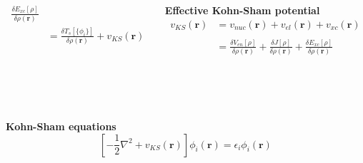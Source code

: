 \documentclass[mathserif, 8pt]{beamer}
\begin{document}
\begin{frame}
\begin{columns}
\begin{column}{.50\textwidth}
\begin{align}
	\frac{\delta E_{xc}[\rho]}{\delta \rho(\boldsymbol{r})}\\
	\nonumber
	&= \frac{\delta T_s[\lbrace\phi_i\rbrace]}{\delta \rho(\boldsymbol{r})} + v_{KS}(\boldsymbol{r})
    \end{align}
    \end{column}
    \begin{column}{.50\textwidth}
    \centering
    \textbf{Effective Kohn-Sham potential}
    \begin{align}
	\nonumber
	v_{KS}(\boldsymbol{r}) &= 
	v_{nuc}(\boldsymbol{r}) + v_{el}(\boldsymbol{r}) + v_{xc}(\boldsymbol{r})\\
	\nonumber
				&\\
	\nonumber
				&=
	\frac{\delta V_{en}[\rho]}{\delta \rho(\boldsymbol{r})} + 
	\frac{\delta J[\rho]}{\delta \rho(\boldsymbol{r})} + 
	\frac{\delta E_{xc}[\rho]}{\delta \rho(\boldsymbol{r})}
    \end{align}
    \end{column}
    \end{columns}
    \ \\
    \ \\
    \ \\
    \centering
    \textbf{Kohn-Sham equations}
    \begin{equation}
	\nonumber
	\left[-\frac{1}{2}\nabla^2 + v_{KS}(\boldsymbol{r})\right]\phi_i(\boldsymbol{r}) = 
	\epsilon_i\phi_i(\boldsymbol{r})
    \end{equation}
\end{frame}
\end{document}
